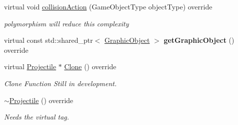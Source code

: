\begin{DoxyCompactItemize}
\item 
\mbox{\label{class_projectile_a8dae5b6cc0293fc6c85797fcf2019492}} 
virtual void \hyperlink{class_projectile_a8dae5b6cc0293fc6c85797fcf2019492}{collision\+Action} (Game\+Object\+Type object\+Type) override
\begin{DoxyCompactList}\small\item\em polymorphism will reduce this complexity \end{DoxyCompactList}\item 
\mbox{\label{class_projectile_a639f52184c8b9720ca8c36371303332d}} 
virtual const std\+::shared\+\_\+ptr$<$ \hyperlink{class_graphic_object}{Graphic\+Object} $>$ {\bfseries get\+Graphic\+Object} () override
\item 
\mbox{\label{class_projectile_a39653a4aa80df0364e15854f0f5e389d}} 
virtual \hyperlink{class_projectile}{Projectile} $\ast$ \hyperlink{class_projectile_a39653a4aa80df0364e15854f0f5e389d}{Clone} () override
\begin{DoxyCompactList}\small\item\em Clone Function Still in development. \end{DoxyCompactList}\item 
\mbox{\label{class_projectile_add4d983566a326200ea1d7c74737e108}} 
\hyperlink{class_projectile_add4d983566a326200ea1d7c74737e108}{$\sim$\+Projectile} () override
\begin{DoxyCompactList}\small\item\em Needs the virtual tag. \end{DoxyCompactList}\end{DoxyCompactItemize}
